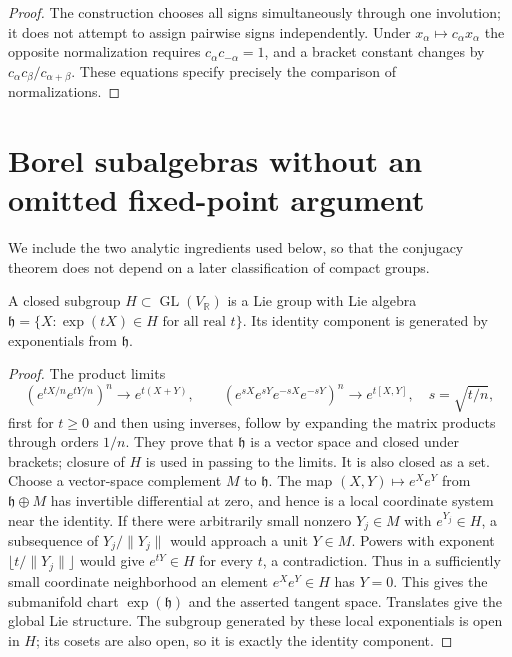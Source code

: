 \begin{proof}
The construction chooses all signs simultaneously through
one involution; it does not attempt to assign pairwise signs
independently. Under \(x_\alpha\mapsto c_\alpha x_\alpha\)
the opposite normalization requires \(c_\alpha c_{-\alpha}=1\),
and a bracket constant changes by
\(c_\alpha c_\beta/c_{\alpha+\beta}\).
These equations specify precisely the comparison of normalizations.
\end{proof}

\section{Borel subalgebras without an omitted fixed-point argument}

We include the two analytic ingredients used below, so that
the conjugacy theorem does not depend on a later classification
of compact groups.

\begin{lemma}\label{supp:closed-matrix-groups}
A closed subgroup \(H\subset\operatorname{GL}(V_{\mathbb R})\)
is a Lie group with Lie algebra
\(\mathfrak h=\{X:\exp(tX)\in H\text{ for all real }t\}\).
Its identity component is generated by exponentials from
\(\mathfrak h\).
\end{lemma}
\begin{proof}
The product limits
\[
 (e^{tX/n}e^{tY/n})^n\longrightarrow e^{t(X+Y)},\qquad
 (e^{sX}e^{sY}e^{-sX}e^{-sY})^{n}
       \longrightarrow e^{t[X,Y]},\quad s=\sqrt{t/n},
\]
first for \(t\ge0\) and then using inverses, follow by
expanding the matrix products through orders \(1/n\).
They prove that \(\mathfrak h\) is a vector space and
closed under brackets; closure of \(H\) is used in passing
to the limits. It is also closed as a set.
Choose a vector-space complement \(M\) to \(\mathfrak h\).
The map \((X,Y)\mapsto e^Xe^Y\) from
\(\mathfrak h\oplus M\) has invertible differential at zero,
and hence is a local coordinate system near the identity.
If there were arbitrarily small nonzero \(Y_j\in M\)
with \(e^{Y_j}\in H\), a subsequence of
\(Y_j/\|Y_j\|\) would approach a unit \(Y\in M\).
Powers with exponent \(\lfloor t/\|Y_j\|\rfloor\)
would give \(e^{tY}\in H\) for every \(t\), a contradiction.
Thus in a sufficiently small coordinate neighborhood an
element \(e^Xe^Y\in H\) has \(Y=0\).
This gives the submanifold chart \(\exp(\mathfrak h)\)
and the asserted tangent space. Translates give the global
Lie structure. The subgroup generated by these local
exponentials is open in \(H\); its cosets are also open,
so it is exactly the identity component.
\end{proof}

